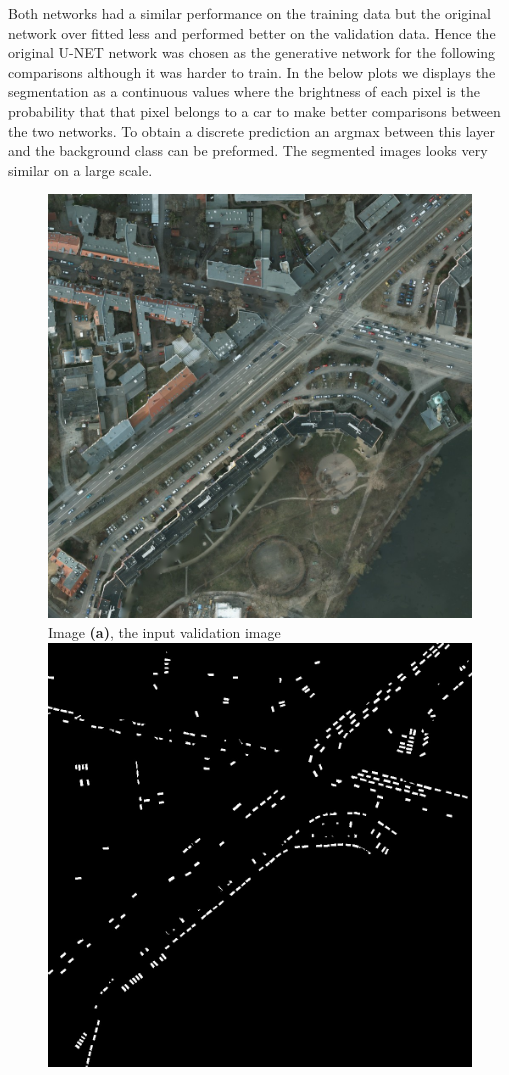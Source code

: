 \documentclass{kththesis}
\begin{document}
Both networks had a similar performance on the training data but the original network over fitted less and performed better on the validation data. Hence the original U-NET network was chosen as the generative network for the following comparisons although it was harder to train.
In the below plots we displays the segmentation as a continuous values where the brightness of each pixel is the probability that that pixel belongs to a car to make better comparisons between the two networks. To obtain a discrete prediction an argmax between this layer and the background class can be preformed. The segmented images looks very similar on a large scale.
\begin{figure}[H]
  \includegraphics[width=\linewidth]{gan_vs_class/img_4}
  Image \textbf{(a)}, the input validation image
\endminipage\hfill
{}
  \includegraphics[width=\linewidth]{gan_vs_class/label_4}

\end{figure}
\end{document}
